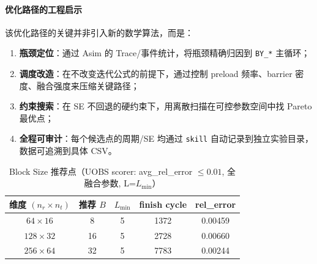     \paragraph{优化路径的工程启示}

    该优化路径的关键并非引入新的数学算法，而是：
    \begin{enumerate}
        \item \textbf{瓶颈定位}：通过 Asim 的 Trace/事件统计，将瓶颈精确归因到 \texttt{BY\_*}
            主循环；

        \item \textbf{调度改造}：在不改变迭代公式的前提下，通过控制 preload 频率、barrier
            密度、融合强度来压缩关键路径；

        \item \textbf{约束搜索}：在 SE 不回退的硬约束下，用离散扫描在可控参数空间中找
            Pareto 最优点；

        \item \textbf{全程可审计}：每个候选点的周期/SE 均通过 \texttt{skill}
            自动记录到独立实验目录，数据可追溯到具体 CSV。
    \end{enumerate}

    \begin{table}[H]
        \centering
        \caption{Block Size 推荐点（UOBS scorer: avg\_rel\_error $\leq0.01$,
        全融合参数, L=$L_{\min}$）}
        \begin{tabular}{c|cccc}
            \toprule 维度 $(n_{r}\times n_{t})$ & 推荐 $B$ & $L_{\min}$ & finish cycle & rel\_error \\
            \midrule $64\times16$             & 8      & 5          & 1372         & 0.00459    \\
            $128\times32$                     & 16     & 5          & 2728         & 0.00660    \\
            $256\times64$                     & 32     & 5          & 7783         & 0.00244    \\
            \bottomrule
        \end{tabular}
    \end{table}

